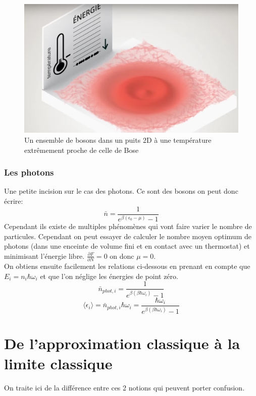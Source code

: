 \begin{figure}[H]
	\begin{center}
		\includegraphics[scale=0.2]{./img/IM4}
		\caption{Un ensemble de bosons dans un puits 2D à une température extrêmement proche de celle de Bose}
	\end{center}
\end{figure}

\subsubsection*{Les photons}

Une petite incision sur le cas des photons. Ce sont des bosons on peut donc écrire:
$$\bar{n}=\frac{1}{e^{\beta (\epsilon_0 -\mu)}-1}$$
Cependant ils existe de multiples phénomènes qui vont faire varier le nombre de particules. Cependant on peut essayer de calculer le nombre moyen optimum de photons (dans une enceinte de volume fini et en contact avec un thermostat) et minimisant l'énergie libre. $\frac{\partial F}{\partial N}=0$ on donc $\mu=0$. \\
On obtiens ensuite facilement les relations ci-dessous en prenant en compte que $E_i=n_i\hbar \omega_i$ et que l'on néglige les énergies de point zéro.
$$\bar{n}_{phot,i}=\frac{1}{e^{\beta (\beta \hbar \omega_i)}-1}$$
$$\langle \epsilon_i \rangle=\bar{n}_{phot,i}\hbar \omega_i=\frac{\hbar \omega_i}{e^{\beta (\beta \hbar \omega_i)}-1}$$


\section{De l'approximation classique à la limite classique}


On traite ici de la différence entre ces 2 notions qui peuvent porter confusion.


